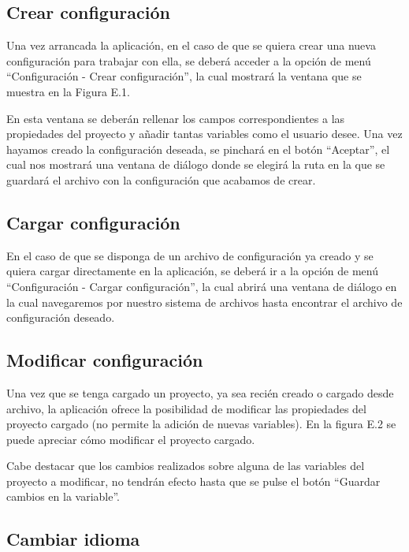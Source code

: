 \subsection{Crear configuración}

Una vez arrancada la aplicación, en el caso de que se quiera crear una nueva configuración para trabajar con ella, se deberá acceder a la opción de menú ``Configuración - Crear configuración'', la cual mostrará la ventana que se muestra en la Figura E.1.


En esta ventana se deberán rellenar los campos correspondientes a las propiedades del proyecto y añadir tantas variables como el usuario desee. Una vez hayamos creado la configuración deseada, se pinchará en el botón ``Aceptar'', el cual nos mostrará una ventana de diálogo donde se elegirá la ruta en la que se guardará el archivo con la configuración que acabamos de crear.

\subsection{Cargar configuración}

En el caso de que se disponga de un archivo de configuración ya creado y se quiera cargar directamente en la aplicación, se deberá ir a la opción de menú ``Configuración - Cargar configuración'', la cual abrirá una ventana de diálogo en la cual navegaremos por nuestro sistema de archivos hasta encontrar el archivo de configuración deseado.

\subsection{Modificar configuración}

Una vez que se tenga cargado un proyecto, ya sea recién creado o cargado desde archivo, la aplicación ofrece la posibilidad de modificar las propiedades del proyecto cargado (no permite la adición de nuevas variables). En la figura E.2 se puede apreciar cómo modificar el proyecto cargado.


Cabe destacar que los cambios realizados sobre alguna de las variables del proyecto a modificar, no tendrán efecto hasta que se pulse el botón ``Guardar cambios en la variable''.

\subsection{Cambiar idioma}

